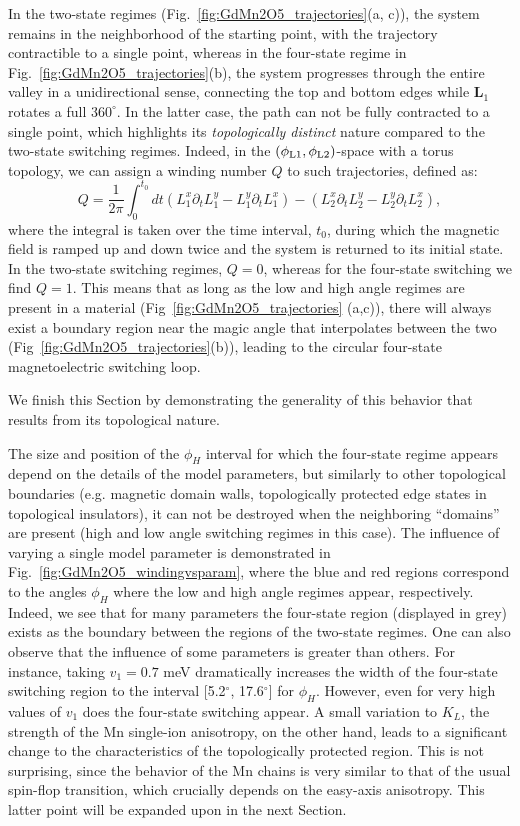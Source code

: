 In the two-state regimes (Fig.~\ref{fig:GdMn2O5_trajectories}(a, c)), the system remains in the neighborhood of the starting point, with the trajectory contractible to a single point, whereas in the four-state regime in Fig.~\ref{fig:GdMn2O5_trajectories}(b), the system progresses through the entire valley in a unidirectional sense, connecting the top and bottom edges while $\bm{L}_1$ rotates a full $360^\circ$.
In the latter case, the path can not be fully contracted to a single point, which highlights its {\em  topologically distinct} nature compared to the two-state switching regimes.
Indeed, in the $(\phi_{\rm L1},\phi_{\rm L2})$-space with a torus topology, we can assign a winding number $Q$ to such trajectories, defined as:
\begin{equation}
Q=\frac{1}{2\pi}\int_0^{t_0} dt (L_1^x\partial_t L_1^y - L_1^y \partial_t L_1^x) - (L_2^x\partial_t L_2^y - L_2^y \partial_t L_2^x),
\end{equation}
where the integral is taken over the time interval, $t_0$, during which the magnetic field is ramped up and down twice and the system is returned to its initial state.
In the two-state switching regimes, $Q  = 0$, whereas for the four-state switching we find $Q = 1$.
This means that as long as the low and high angle regimes are present in a material (Fig~\ref{fig:GdMn2O5_trajectories} (a,c)), there will always exist a boundary region near the magic angle that interpolates between the two (Fig~\ref{fig:GdMn2O5_trajectories}(b)), leading to the circular four-state magnetoelectric switching loop.

We finish this Section by demonstrating the generality of this behavior that results from its topological nature.

The size and position of the $\phi_H$ interval for which the four-state regime appears depend on the details of the model parameters, but similarly to other topological boundaries (e.g. magnetic domain walls, topologically protected edge states in topological insulators), it can not be destroyed when the neighboring ``domains'' are present (high and low angle switching regimes in this case).
The influence of varying a single model parameter is demonstrated in Fig.~\ref{fig:GdMn2O5_windingvsparam}, where the blue and red regions correspond to the angles $\phi_H$ where the low and high angle regimes appear, respectively.
Indeed, we see that for many parameters the four-state region (displayed in grey) exists as the boundary between the regions of the two-state regimes.
One can also observe that the influence of some parameters is greater than others. For instance, taking $v_1=0.7$ meV dramatically increases the width of the four-state switching region to the interval [5.2$^\circ$, 17.6$^\circ$] for $\phi_H$.
However, even for very high values of $v_1$ does the four-state switching appear.
A small variation to $K_L$, the strength of the Mn single-ion anisotropy, on the other hand, leads to a significant change to the characteristics of the topologically protected region.
This is not surprising, since the behavior of the Mn chains is very similar to that of the usual spin-flop transition, which crucially depends on the easy-axis anisotropy. This latter point will be expanded upon in the next Section.

